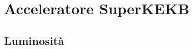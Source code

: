 









\section{Acceleratore SuperKEKB}

\begin{comment}
La sensibilità nelle misure di precisione alla ricerca di nuova fisica, sono possibili soprattutto grazie alla complessità e alle ottime prestazioni dell'acceleratore SuperKEKB che ospita il rivelatore ermetico Belle II. Risultato di molti anni di efficiente collaborazione tra i ricercatori del laboratorio KEK e tutte le collaborazioni internazionali che partecipano all'esperimento.

SuperKEKB è un collider asimmetrico $e^{+}e^{-}$ di 3 km di circonferenza, piccato a una energia del centro di massa pari a $\sqrt{s}$ = 10.58 GeV, che corrisponde alla massa della risonanza $\Upsilon(4S)$. 

Rispetto al suo predecessore KEKB, l'attuale acceleratore ha permesso di ottenere il primato di luminosità mai raggiunta, pari a ......, utilizzando uno schema differente nell'accelerazione e scontro dei fasci, attraverso alcune migliorìe e aggiunte nelle componenti fondamentali dell'acceleratore stesso.

\begin{figure}
\texttt{[image: SuperKEKB]}
\caption{L'acceleratore SuperKEKB nel 2021. Le lettere V ed H indicano rispettivamente i collimatori verticali ed orizzontali. Ciascun anello è diviso in 12 sezioni, dalla prima chiamata D01 fino al'ultima D12.}
\label{fig:superkekb}
\end{figure}


(Andiamo attraverso le sue principali caratteristiche)
\end{comment}

\subsection{Luminosità}

